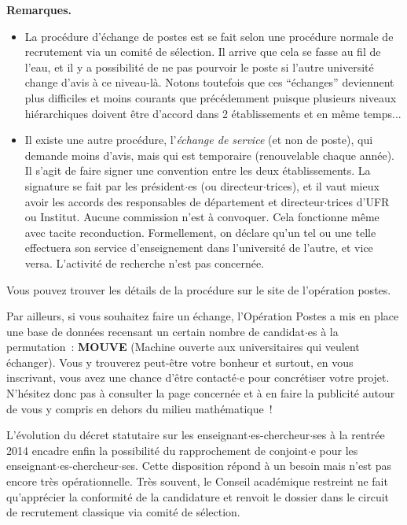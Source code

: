 {\bf Remarques.}
\begin{itemize}
\item La proc\'edure d'\'echange de postes est se fait selon une proc\'edure normale de recrutement via un comit\'e de sélection. Il arrive que cela se fasse au fil de l'eau, et il y a possibilit\'e de ne pas pourvoir le poste si l'autre universit\'e change d'avis \`a ce niveau-l\`a. Notons toutefois que ces ``\'echanges'' deviennent plus difficiles et moins courants que pr\'ec\'edemment puisque plusieurs niveaux hi\'erarchiques doivent \^etre d'accord dans 2 \'etablissements et en m\^eme temps...


\item Il existe une autre proc\'edure, l'{\em \'echange de service}
(et non de poste), qui demande moins d'avis, mais qui est temporaire
(renouvelable chaque ann\'ee).
Il s'agit de faire signer une convention entre les
deux \'etablissements. La signature se fait par les pr\'esident$\cdot$es (ou
directeur$\cdot$trices), et il vaut mieux avoir les accords des responsables de
d\'epartement et directeur$\cdot$trices d'UFR ou Institut. Aucune commission
n'est \`a convoquer. Cela fonctionne m\^eme avec tacite
reconduction. Formellement, on d\'eclare qu'un tel ou une telle effectuera son
service d'enseignement dans l'universit\'e de l'autre, et vice
versa. L'activit\'e de recherche n'est pas concern\'ee.
\end{itemize}

Vous pouvez trouver les d\'etails de la proc\'edure sur le site de
l'op\'eration postes. 


\medskip

Par ailleurs, si vous souhaitez faire un \'echange, l'Op\'eration
Postes a mis en place une base de donn\'ees recensant un certain
nombre de candidat$\cdot$es \`a la permutation~: \textbf{MOUVE} (Machine
ouverte aux universitaires qui veulent \'echanger). Vous y trouverez
peut-\^etre votre bonheur et surtout, en vous inscrivant, vous avez
une chance d'\^etre contact\'e$\cdot$e pour concr\'etiser votre projet.
N'h\'esitez donc pas \`a consulter la page concern\'ee
et \`a en faire la publicit\'e autour de vous
y compris en dehors du milieu math\'ematique~!

\medskip

L'\'evolution du d\'ecret statutaire sur les enseignant$\cdot$es-chercheur$\cdot$ses \`a la rentr\'ee 2014 
encadre enfin la possibilit\'e du rapprochement de conjoint$\cdot$e pour les enseignant$\cdot$es-chercheur$\cdot$ses. 
Cette disposition r\'epond \`a un besoin mais n'est pas encore tr\`es op\'erationnelle. 
Tr\`es souvent, le Conseil acad\'emique restreint ne
fait qu'appr\'ecier la conformit\'e de la candidature et renvoit le dossier dans le circuit de recrutement classique via comit\'e de s\'election.


